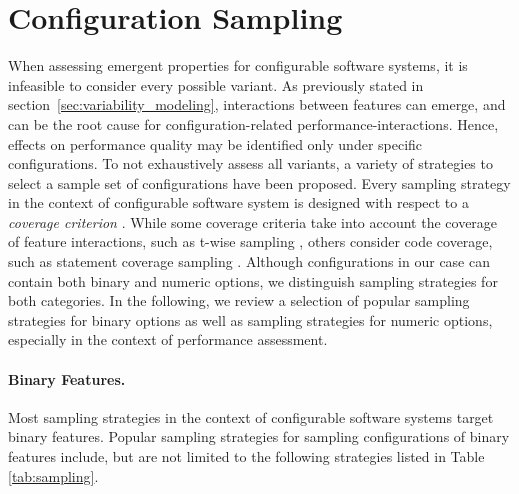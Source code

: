 \section{Configuration Sampling}\label{sec:configuration_sam}
When assessing emergent properties for configurable software systems, it is
infeasible to consider every possible variant. As previously stated in
section~\ref{sec:variability_modeling}, interactions between
features can emerge, and can be the root cause for configuration-related
performance-interactions. Hence, effects on performance quality may be
identified only under specific configurations. To not exhaustively assess all
variants, a variety of strategies to select a sample set of configurations have been proposed.
Every sampling strategy in the context of configurable software system is
designed with respect to a \emph{coverage criterion} 
\citep{apel_feature-oriented_2013}. While some coverage criteria take into
account the coverage of feature interactions, such as t-wise sampling
\citep{williams_practical_1996}, others consider code coverage, such as
statement coverage sampling \citep{tartler_static_2014}.
Although configurations in our case can contain both binary and numeric options, we
distinguish sampling strategies for both categories. In the following, we
review a selection of popular sampling strategies for binary options as well as
sampling strategies for numeric options, especially in the context of
performance assessment.

\paragraph{Binary Features.}
Most sampling strategies in the context of configurable software systems
target binary features. Popular sampling strategies for sampling configurations
of binary features include, but are not limited to the following
\citep{apel_feature-oriented_2013,medeiros_comparison_2016} strategies listed in
Table \ref{tab:sampling}.

